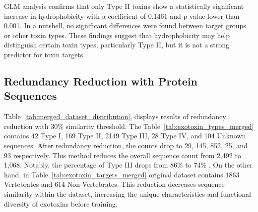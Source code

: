  \gls{GLM} analysis confirms that only Type II toxins show a statistically significant increase in hydrophobicity with a coefficient of 0.1461 and p value lower than 0.001. In a nutshell, no significant differences were found between target groups or other toxin types. These findings suggest that hydrophobicity may help distinguish certain toxin types, particularly Type II, but it is not a strong predictor for toxin targets. 


\subsection{Redundancy Reduction with Protein Sequences}

Table~\ref{tab:merged_dataset_distribution}, displays results of redundancy reduction with 30\% similarity threshold. The Table~\ref{tab:exotoxin_types_merged} contains 42 Type I, 169 Type II, 2149 Type III, 28 Type IV, and 104 Unknown sequences. 
After redundancy reduction, the counts drop to 29, 145, 852, 25, and 93 respectively. This method reduces the overall sequence count from 2,492 to 1,068. Notably, the percentage of Type III drops from 86\% to 74\% . On the other hand, in Table~\ref{tab:exotoxin_targets_merged} original dataset contains 1863 Vertebrates and 614 Non-Vertebrates. This reduction decreases sequence similarity within the dataset, increasing the unique characteristics and functional diversity of exotoxins before training.


